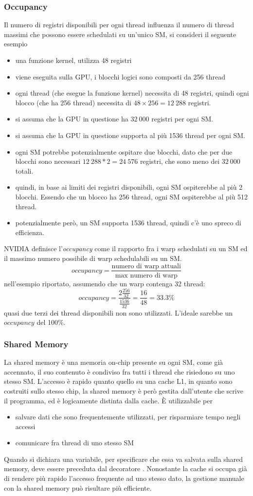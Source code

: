 \documentclass[10pt, letterpaper]{report}
\begin{document}
\subsubsection{Occupancy}
Il numero di registri disponibili per ogni thread influenza il numero di thread massimi che possono essere schedulati su un'unico SM, si consideri il seguente esempio\begin{itemize}
    \item una funzione kernel, utilizza 48 registri 
    \item viene eseguita sulla GPU, i blocchi logici sono composti da 256 thread 
    \item ogni thread (che esegue la funzione kernel) necessita di 48 registri, quindi ogni blocco (che ha 256 thread) necessita di $48\times 256=12\ 288$ registri.
    \item si assuma che la GPU in questione ha $32 \ 000$ registri per ogni SM. 
    \item si assuma che la GPU in questione supporta al più 1536 thread per ogni SM. 
    \item ogni SM potrebbe potenzialmente ospitare due blocchi, dato che per due blocchi sono necessari $12\ 288*2=24\ 576$ registri, che sono meno dei $32\ 000$ totali.
    \item quindi, in base ai limiti dei registri disponibili, ogni SM ospiterebbe al più 2 blocchi. Essendo che un blocco ha 256 thread, ogni SM ospiterebbe al più 512 thread.
    \item potenzialmente però, un SM supporta 1536 thread, quindi c'è uno spreco di efficienza.
\end{itemize}
NVIDIA definisce l'\textit{occupancy} come il rapporto fra i warp schedulati su un SM ed il massimo numero possibile di warp schedulabili su un SM.
$$ occupancy=\frac{\text{numero di warp attuali}}{\text{max numero di warp}}$$
nell'esempio riportato, assumendo che un warp contenga 32 thread:
$$ occupancy =\frac{2\frac{256}{32}}{\frac{1536}{32}}=\frac{16}{48}=33.3\%$$
quasi due terzi dei thread disponibili non sono utilizzati. L'ideale sarebbe un $occupancy$ del 100\%.
\subsubsection{Shared Memory}
La shared memory è una memoria on-chip presente su ogni SM, come già accennato, il suo contenuto è condiviso fra tutti i thread che risiedono su uno stesso SM. L'accesso è rapido quanto quello su una cache L1, in quanto sono costruiti sullo stesso chip, la shared memory è però gestita dall'utente che scrive il programma, ed è logicamente distinta dalla cache. È utilizzabile per\begin{itemize}
    \item salvare dati che sono frequentemente utilizzati, per risparmiare tempo negli accessi 
    \item comunicare fra thread di uno stesso SM
\end{itemize}
Quando si dichiara una variabile, per specificare che essa va salvata sulla shared memory, deve essere preceduta dal decoratore . Nonostante la cache si occupa già di rendere più rapido l'accesso frequente ad uno stesso dato, la gestione manuale con la shared memory può risultare più efficiente.
\end{document}
